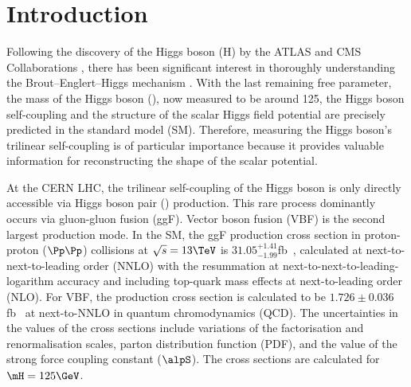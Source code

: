 \documentclass[11pt,a4paper,cmspaper,final,collab]{cms-tdr}
\begin{document}

\maketitle

\section{Introduction}\label{sec:intro}
Following the discovery of the Higgs boson (H) by the ATLAS and CMS Collaborations \cite{HiggsdiscoveryAtlas, Chatrchyan:2012ufa, Chatrchyan:2013lba}, there has been significant interest in thoroughly understanding the Brout--Englert--Higgs mechanism \cite{Higgs1, Higgs:1964pj}. With the last remaining free parameter, the mass of the Higgs boson (\mH), now measured to be around 125\GeV, the Higgs boson self-coupling and the structure of the scalar Higgs field potential are precisely predicted in the standard model (SM). Therefore, measuring the Higgs boson's trilinear self-coupling \lbdHHH is of particular importance because it provides valuable information for reconstructing the shape of the scalar potential.

At the CERN LHC, the trilinear self-coupling of the Higgs boson is only directly accessible via Higgs boson pair (\HH) production. 
This rare process dominantly occurs via gluon-gluon fusion (ggF). Vector boson fusion (VBF) is the second largest production mode. 
In the SM, the ggF production cross section in proton-proton ($\Pp\Pp$) collisions at $\sqrt{s} = 13\TeV$ is $31.05^{+1.41}_{-1.99}$\unit{fb}~\cite{Grazzini:2018bsd,Dawson:1998py,Borowka:2016ehy,Baglio:2018lrj,deFlorian:2013jea,Shao:2013bz,deFlorian:2015moa}, calculated at
next-to-next-to-leading order (NNLO) with the resummation at next-to-next-to-leading-logarithm
accuracy and including top-quark mass effects at next-to-leading order (NLO). For VBF, the production cross section is calculated to be $1.726\pm 0.036$\unit{fb}~\cite{Dreyer:2018qbw,Baglio:2012np,Liu-Sheng:2014gxa} at next-to-NNLO in quantum chromodynamics (QCD). The
uncertainties in the values of the cross sections include variations of the factorisation and renormalisation scales, parton distribution function (PDF), and the value of the strong force coupling constant ($\alpS$). The cross sections are calculated for $\mH = 125\GeV$.
\end{document}
